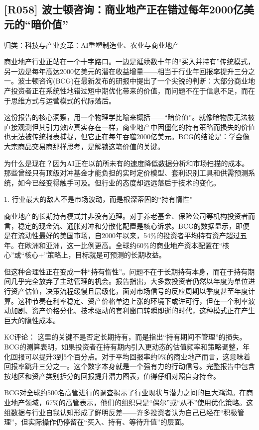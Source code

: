 \documentclass[11pt]{ctexart}
\begin{document}
\subsection{[R058] 波士顿咨询：商业地产正在错过每年2000亿美元的“暗价值”}
{\small\color{refgray}归类：科技与产业变革：AI重塑制造业、农业与商业地产}

商业地产行业正站在一个十字路口。一边是延续数十年的“买入并持有”传统模式，另一边是每年高达2000亿美元的潜在收益增量——相当于行业年回报率提升三分之一。波士顿咨询(BCG)在最新发布的研报中提出了一个尖锐的判断：大部分商业地产投资者正在系统性地错过短中期优化带来的价值，而问题不在于信息不足，而在于思维方式与运营模式的代际落后。

这份报告的核心洞察，用一个物理学比喻来概括——“暗价值”。就像暗物质无法被直接观测但其引力效应真实存在一样，商业地产中因僵化的持有策略而损失的价值也无法被传统报表捕捉，但它正在每年吞噬2000亿美元。BCG的结论是：学会像大宗商品交易商那样思考，是解锁这笔价值的关键。

为什么是现在？因为AI正在以前所未有的速度降低数据分析和市场扫描的成本。那些曾经只有顶级对冲基金才能负担的实时定价模型、套利识别工具和供需预测系统，如今已经变得触手可及。但行业的态度却远远落后于技术的变化。

1. 行业最大的敌人不是市场波动，而是根深蒂固的“持有惰性”

商业地产的长期持有模式并非没有道理。对于养老基金、保险公司等机构投资者而言，稳定的现金流、通胀对冲和分散化配置是核心诉求。BCG的数据显示，即便是在流动性最好的美国市场，自2000年以来，54\%的投资者平均持有资产超过五年。在欧洲和亚洲，这一比例更高。全球约60\%的商业地产资本配置在“核心”或“核心+”策略上，目标就是可预测的长期收益。

但这种合理性正在变成一种“持有惰性”。问题不在于长期持有本身，而在于持有期间几乎完全放弃了主动管理的机会。报告指出，大多数投资者仍然以年度为单位进行资产估值，决策流程缓慢且层级化，面对市场信号的反应周期以季度甚至年度计算。这种节奏在利率稳定、资产价格单边上涨的环境下或许可行，但在一个利率波动加剧、资产价格分化、技术驱动的套利窗口转瞬即逝的时代，这种模式正在产生巨大的隐性成本。

KC评论： 这里的关键不是否定长期持有，而是指出“持有期间不管理”的损失。BCG的测算表明，如果投资者在持有期内引入更动态的估值频率和策略调整，年化回报可以提升3到5个百分点。对于平均回报率约9\%的商业地产而言，这意味着回报率跳升三分之一。这个数字本身就是一个强有力的行动信号。完整报告中包含按地区和资产类别拆分的回报提升潜力图表，值得仔细对照自身持仓。

BCG对全球约500名高管进行的调查揭示了行业现状与潜力之间的巨大鸿沟。在商业地产领域，67\%的高管表示，他们的组织只是“偶尔”或“从不”使用优化策略。这组数据与行业自我认知形成了鲜明反差——许多投资者认为自己已经在“积极管理”，但实际操作仍停留在“买入、持有、等待升值”的层面。
\end{document}
